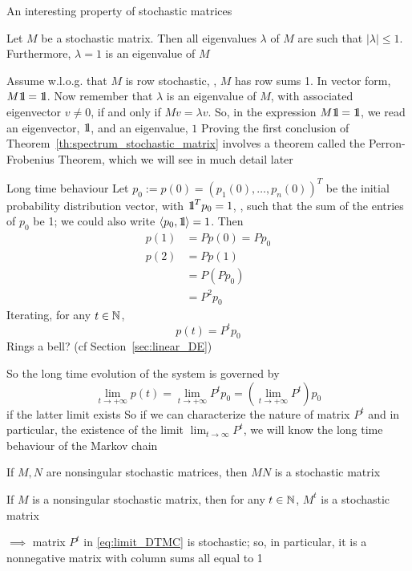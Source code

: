 \documentclass[aspectratio=169]{beamer}
\begin{document}
\begin{frame}{An interesting property of stochastic matrices}
\begin{theorem}\label{th:spectrum_stochastic_matrix}
	Let $M$ be a stochastic matrix. Then all eigenvalues $\lambda$ of $M$ are such that $|\lambda|\leq 1$. 
	Furthermore, $\lambda =1$ is an eigenvalue of $M$
\end{theorem}
\vfill
Assume w.l.o.g. that $M$ is row stochastic, \ie, $M$ has row sums 1. In vector form, $M\nbOne=\nbOne$. Now remember that $\lambda$ is an eigenvalue of $M$, with associated eigenvector $v\neq 0$, if and only if $Mv=\lambda v$. So, in the expression $M\nbOne=\nbOne$, we read an eigenvector, $\nbOne$, and an eigenvalue, $1$
\vfill
Proving the first conclusion of Theorem~\ref{th:spectrum_stochastic_matrix} involves a theorem called the Perron-Frobenius Theorem, which we will see in much detail later
\end{frame}

\begin{frame}{Long time behaviour}
Let $p_0:=p(0)=(p_1(0),\ldots,p_n(0))^T$ be the initial probability distribution vector, with $\nbOne^Tp_0=1$, \ie, such that the sum of the entries of $p_0$ be 1; we could also write $\langle p_0,\nbOne\rangle = 1$. Then
\begin{align*}
p(1) &= Pp(0) = Pp_0 \\
p(2) &= Pp(1)\\
&= P(Pp_0) \\
&= P ^2p_0
\end{align*}
Iterating, for any $t\in\mathbb{N}$,
\[
p(t)=P^tp_0
\]
\vfill
Rings a bell? (cf Section~\ref{sec:linear_DE})
\end{frame}

\begin{frame}
So the long time evolution of the system is governed by
\begin{equation}\label{eq:limit_DTMC}
\lim_{t\rightarrow +\infty}p(t)
=\lim_{t\rightarrow +\infty}P^tp_0
=\left(\lim_{t\rightarrow +\infty}P^t\right)p_0
\end{equation}
if the latter limit exists
\vfill
So if we can characterize the nature of matrix $P^t$ and in particular, the existence of the limit $\lim_{t\to\infty}P^t$, we will know the long time behaviour of the Markov chain
\end{frame}

\begin{frame}
\begin{theorem}
If $M,N$ are nonsingular stochastic matrices, then $MN$ is a stochastic matrix
\end{theorem}
\vfill
\begin{corollary}
If $M$ is a nonsingular stochastic matrix, then for any $t\in\mathbb{N}$, $M^t$ is a stochastic matrix
\end{corollary}
\vfill
$\implies$ matrix $P^t$ in \eqref{eq:limit_DTMC} is stochastic; so, in particular, it is a nonnegative matrix with column sums all equal to 1
\end{frame}
\end{document}
